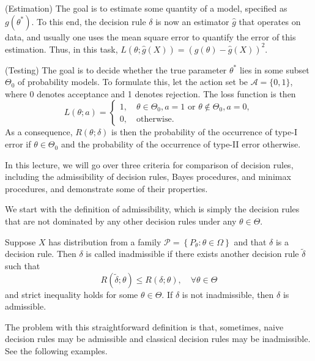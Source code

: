 \begin{eg}
    (Estimation) The goal is to estimate some quantity of a model, specified as $g(\theta^*)$. To this end, the decision rule $\delta$ is now an estimator $\hat g$ that operates on data, and usually one uses the mean square error to quantify the error of this estimation. Thus, in this task, $L(\theta;\hat g(X))=(g(\theta)-\hat g(X))^2$.
\end{eg}

\begin{eg}
    (Testing) The goal is to decide whether the true parameter $\theta^*$ lies in some subset $\Theta_0$ of probability models. To formulate this, let the action set be $\mathcal{A}=\{0,1\}$, where 0 denotes acceptance and 1 denotes rejection. The loss function is then
    \[
    L(\theta;a)=\begin{cases}
        1,\quad \theta\in\Theta_0, a=1 \text{ or } \theta\notin \Theta_0, a=0,\\
        0,\quad \text{otherwise}.
    \end{cases}
    \]
    As a consequence, $R(\theta;\delta)$ is then the probability of the occurrence of type-I error if $\theta\in\Theta_0$ and the probability of the occurrence of type-II error otherwise.
\end{eg}

In this lecture, we will go over three criteria for comparison of decision rules, including the admissibility of decision rules, Bayes procedures, and minimax procedures, and demonstrate some of their properties.

We start with the definition of admissibility, which is simply the decision rules that are not dominated by any other decision rules under any $\theta\in\Theta$.

\begin{de}
    Suppose $X$ has distribution from a family $\mathcal{P}=\left\{P_\theta: \theta \in \Omega\right\}$ and that $\delta$ is a decision rule. Then $\delta$ is called inadmissible if there exists another decision rule $\tilde{\delta}$ such that
    \[
    R(\tilde\delta;\theta)\le R(\delta;\theta),\quad \forall\theta\in\Theta
    \]
    and strict inequality holds for some $\theta\in\Theta$. If $\delta$ is not inadmissible, then $\delta$ is admissible.
\end{de}

The problem with this straightforward definition is that, sometimes, naive decision rules may be admissible and classical decision rules may be inadmissible. See the following examples.

